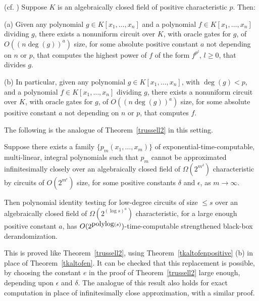 \documentclass[11pt]{article}
\begin{document}
\begin{theorem}  \label{tkaltofenpositive}
(cf. \cite{kaltofenlec})
Suppose  $K$ is an algebraically closed field of positive characteristic $p$. Then:

\noindent (a) Given any polynomial $g \in K[x_1,\ldots,x_n]$ 
and a polynomial  $f \in K[x_1,\ldots,x_n]$ dividing $g$, there exists  a nonuniform circuit over $K$, with oracle gates for $g$, of 
$O((n \deg(g))^a)$ size, for some absolute positive constant $a$ not
depending on $n$ or $p$,  that computes the highest power  of $f$ of the form $f^{p^l}$, $l\ge 0$,  that divides $g$.

\noindent (b) In particular, 
given any polynomial $g \in K[x_1,\ldots,x_n]$, with  $\deg(g) < p$, and
a polynomial  $f \in K[x_1,\ldots,x_n]$ dividing $g$, there exists  a nonuniform circuit over $K$, with oracle gates for $g$,  of 
$O((n \deg(g))^a)$ size, for some absolute positive constant $a$ not
depending on $n$ or $p$,   that computes $f$.
\end{theorem}

The following is the analogue of Theorem~\ref{trussell2} in this setting.

\begin{theorem} \label{trussell2pos}
Suppose there exists a family $\{p_m(x_1,\ldots,x_m)\}$ of
exponential-time-computable,  multi-linear, integral 
polynomials  such  that $p_m$
cannot be approximated infinitesimally closely  
over  an algebraically closed field of $\Omega(2^{m^\delta})$ characteristic 
by  circuits  of 
$O(2^{m^\epsilon})$ size,  for some positive constants  
 $\delta$ and $\epsilon$, as $m \rightarrow \infty$.


Then polynomial identity testing  for low-degree 
circuits  of  size $\le s$  over an algebraically closed 
field of $\Omega(2^{(\log s)^a})$ characteristic,  for  a large enough 
positive constant $a$,  has $O(2^{{\mbox {polylog}}(s)})$-time-computable 
strengthened black-box derandomization.
\end{theorem}


This is proved like  Theorem~\ref{trussell2}, using
Theorem~\ref{tkaltofenpositive} (b)  in place of Theorem~\ref{tkaltofen}. 
It can be checked that 
this replacement is possible, by choosing the constant $e$ in the proof of Theorem~\ref{trussell2} large enough, depending upon $\epsilon$ and $\delta$.
The analogue of this result also holds for exact computation
in place of infinitesimally close approximation, with a similar proof. 
\end{document}
